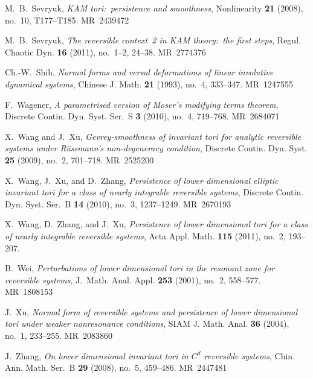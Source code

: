 \documentclass[12pt,reqno]{amsart}
\theoremstyle{definition}
\begin{document}
\begin{thebibliography}{99}
M.~B.~Sevryuk, \emph{KAM tori:\ persistence and smoothness}, Nonlinearity
\textbf{21} (2008), no.~10, T177--T185. MR~2439472

M.~B.~Sevryuk, \emph{The reversible context~2 in KAM theory:\ the first
steps}, Regul. Chaotic Dyn. \textbf{16} (2011), no.~1--2, 24--38. MR~2774376

Ch.-W.~Shih, \emph{Normal forms and versal deformations of linear involutive
dynamical systems}, Chinese J. Math. \textbf{21} (1993), no.~4, 333--347.
MR~1247555

F.~Wagener, \emph{A parametrised version of Moser's modifying terms theorem},
Discrete Contin. Dyn. Syst. Ser.~S \textbf{3} (2010), no.~4, 719--768.
MR~2684071

X.~Wang and J.~Xu, \emph{Gevrey-smoothness of invariant tori for analytic
reversible systems under R\"ussmann's non-degeneracy condition}, Discrete
Contin. Dyn. Syst. \textbf{25} (2009), no.~2, 701--718. MR~2525200

X.~Wang, J.~Xu, and D.~Zhang, \emph{Persistence of lower dimensional elliptic
invariant tori for a class of nearly integrable reversible systems}, Discrete
Contin. Dyn. Syst. Ser.~B \textbf{14} (2010), no.~3, 1237--1249. MR~2670193

X.~Wang, D.~Zhang, and J.~Xu, \emph{Persistence of lower dimensional tori for
a class of nearly integrable reversible systems}, Acta Appl. Math.
\textbf{115} (2011), no.~2, 193--207.

B.~Wei, \emph{Perturbations of lower dimensional tori in the resonant zone for
reversible systems}, J.~Math. Anal. Appl. \textbf{253} (2001), no.~2,
558--577. MR~1808153

J.~Xu, \emph{Normal form of reversible systems and persistence of lower
dimensional tori under weaker nonresonance conditions}, SIAM J. Math. Anal.
\textbf{36} (2004), no.~1, 233--255. MR~2083860

J.~Zhang, \emph{On lower dimensional invariant tori in $C^d$ reversible
systems}, Chin. Ann. Math. Ser.~B \textbf{29} (2008), no.~5, 459--486.
MR~2447481

\end{thebibliography}
\end{document}

